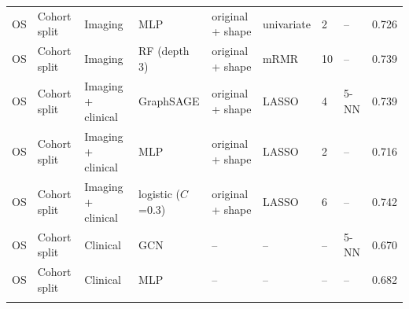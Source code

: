 \begin{tabular}{@{}lllllllll@{}}
OS & Cohort split & Imaging & MLP & original + shape & univariate & 2 & -- & 0.726 \\
OS & Cohort split & Imaging & RF (depth 3) & original + shape & mRMR & 10 & -- & 0.739 \\
OS & Cohort split & Imaging + clinical & GraphSAGE & original + shape & LASSO & 4 & 5-NN & 0.739 \\
OS & Cohort split & Imaging + clinical & MLP & original + shape & LASSO & 2 & -- & 0.716 \\
OS & Cohort split & Imaging + clinical & logistic ($C$=0.3) & original + shape & LASSO & 6 & -- & 0.742 \\
OS & Cohort split & Clinical & GCN & -- & -- & -- & 5-NN & 0.670 \\
OS & Cohort split & Clinical & MLP & -- & -- & -- & -- & 0.682 \\
\botrule
\end{tabular}
